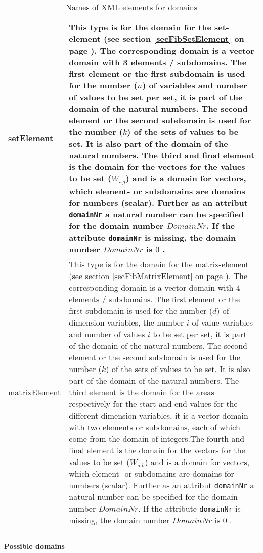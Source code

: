 \begin{center}
\begin{longtable}{|p{25mm}|p{100mm}|}
	setElement & This type is for the domain for the set-element (see section \ref{secFibSetElement} on page \pageref{secFibSetElement}). The corresponding domain is a vector domain with 3 elements / subdomains. The first element or the first subdomain is used for the number ($n$) of variables and number of values to be set per set, it is part of the domain of the natural numbers. The second element or the second subdomain is used for the number ($k$) of the sets of values to be set. It is also part of the domain of the natural numbers. The third and final element is the domain for the vectors for the values to be set ($W_{i.g}$) and is a domain for vectors, which element- or subdomains are domains for numbers (scalar). Further as an attribut \verb|domainNr| a natural number can be specified for the domain number $DomainNr$. If the attribute \verb|domainNr| is missing, the domain number $DomainNr$ is $0$ . \\\hline
	matrixElement & This type is for the domain for the matrix-element (see section \ref{secFibMatrixElement} on page \pageref{secFibMatrixElement}). The corresponding domain is a vector domain with 4 elements / subdomains. The first element or the first subdomain is used for the number ($d$) of dimension variables, the number $i$ of value variables and number of values $i$ to be set per set, it is part of the domain of the natural numbers. The second element or the second subdomain is used for the number ($k$) of the sets of values to be set. It is also part of the domain of the natural numbers. The third element is the domain for the areas respectively for the start and end values for the different dimension variables, it is a vector domain with two elements or subdomains, each of which come from the domain of integers.The fourth and final element is the domain for the vectors for the values to be set ($W_{a.b}$) and is a domain for vectors, which element- or subdomains are domains for numbers (scalar). Further as an attribut \verb|domainNr| a natural number can be specified for the domain number $DomainNr$. If the attribute \verb|domainNr| is missing, the domain number $DomainNr$ is $0$ .\\\hline 

\caption{Names of XML elements for domains}
\label{tableFixXmlElementsForDefinitionRanges}
\end{longtable}
\end{center}


\paragraph{Possible domains}
\label{secXmlDefinitionrangesArea}

